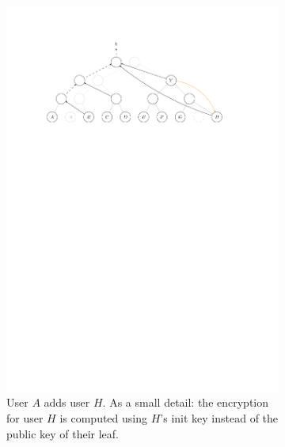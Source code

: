 \begin{figure}
	\centering
	\begin{subfigure}[b]{\textwidth}
		\centering
		\includegraphics[width=\textwidth]{figures/treekem-add-1}
		\caption{User $A$ adds user $H$. As a small detail: the encryption for user $H$ is computed using $H$'s init key instead of the public key of their leaf.}
		\label{fig:treekem-A-add-H}
	\end{subfigure}
	\begin{subfigure}[b]{\textwidth}
		\centering

\end{subfigure}
\end{figure}
